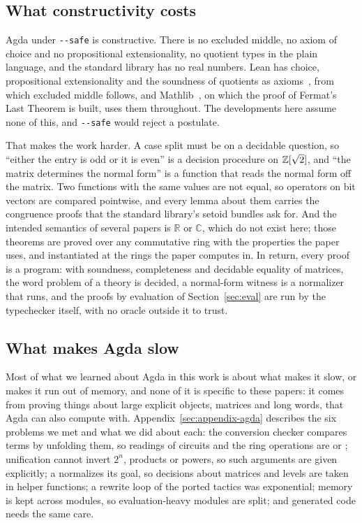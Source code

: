 \subsection{What constructivity costs}\label{sec:why-agda}

Agda under \texttt{-{}-safe} is constructive. There is no excluded
middle, no axiom of choice and no propositional extensionality, no
quotient types in the plain language, and the standard library has no
real numbers. Lean has choice, propositional extensionality and the
soundness of quotients as axioms~\cite{moura2021lean4}, from which
excluded middle follows, and Mathlib~\cite{mathlib2020}, on which the
proof of Fermat's Last Theorem is built, uses them throughout. The
developments here assume none of this, and \texttt{-{}-safe} would
reject a postulate.

That makes the work harder. A case split must be on a decidable
question, so ``either the entry is odd or it is even'' is a decision
procedure on $\mathbb{Z}[\sqrt2]$, and ``the matrix determines the normal
form'' is a function that reads the normal form off the matrix. Two
functions with the same values are not equal, so operators on bit
vectors are compared pointwise, and every lemma about them carries the
congruence proofs that the standard library's setoid bundles ask for.
And the intended semantics of several papers is $\mathbb{R}$ or
$\mathbb{C}$, which do not exist here; those theorems are proved over
any commutative ring with the properties the paper uses, and
instantiated at the rings the paper computes in. In return, every
proof is a program: with soundness, completeness and decidable
equality of matrices, the word problem of a theory is decided, a
normal-form witness is a normalizer that runs, and the proofs by
evaluation of Section~\ref{sec:eval} are run by the typechecker
itself, with no oracle outside it to trust.

\subsection{What makes Agda slow}\label{sec:slow}

Most of what we learned about Agda in this work is about what makes it
slow, or makes it run out of memory, and none of it is specific to
these papers: it comes from proving things about large explicit
objects, matrices and long words, that Agda can also compute with.
Appendix~\ref{sec:appendix-agda} describes the six problems we met and
what we did about each: the conversion checker compares terms by
unfolding them, so readings of circuits and the ring operations are
 or ; unification cannot invert $2^n$,
products or powers, so such arguments are given explicitly; a
 normalizes its goal, so decisions about matrices and levels
are taken in helper functions; a rewrite loop of the ported tactics
was exponential; memory is kept across modules, so evaluation-heavy
modules are split; and generated code needs the same care.
